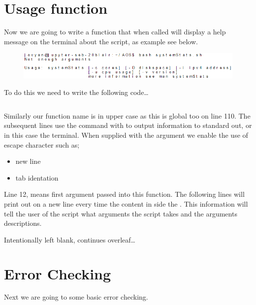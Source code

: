 \documentclass{article}
\begin{document}
\section{Usage function}
\label{sec:usageFunction}
Now we are going to write a function that when called will display a help message on the terminal about the script, as example see below. 

\begin{figure}[H]
    \centering
    \includegraphics[width=1\textwidth]{images/systemStats_output_usage.PNG}
    \label{fig:my_label}
\end{figure}

To do this we need to write the following code\ldots

\inputminted[frame=single,firstline=10, lastline=16,linenos]{bash}{./systemStats.sh}

Similarly our function name is in upper case as this is global too on line 110. The subsequent lines use the  command with to output information to standard out, or in this case the terminal. When supplied with the argument  we enable the use of escape character such as; 
\begin{itemize}
    \item {} new line
    \item {} tab identation 
\end{itemize}

Line 12,  means first argument passed into this function. The following lines will print out on a new line every time the content in side the . This information will tell the user of the script what arguments the script takes and the arguments descriptions.

\begin{center}
\vspace{8em}
    Intentionally left blank, continues overleaf\ldots
    \vspace{2em}
\end{center}

\section{Error Checking}
\label{sec:errorChecking}
Next we are going to some basic error checking.
\end{document}
